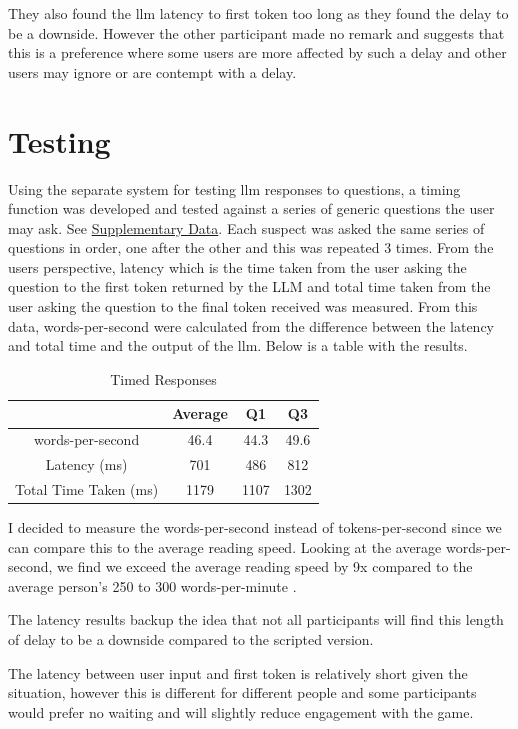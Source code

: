 \documentclass[12pt, a4paper]{report}
\begin{document}
	They also found the \gls{llm} latency to first token too long as they found the delay to be a downside. However the other participant made no remark and suggests that this is a preference where some users are more affected by such a delay and other users may ignore or are contempt with a delay.

	\section{Testing}
	Using the separate system for testing \gls{llm} responses to questions, a timing function was developed and tested against a series of generic questions the user may ask. See \hyperref[section:timedresponses]{Supplementary Data}. Each suspect was asked the same series of questions in order, one after the other and this was repeated 3 times. From the users perspective, latency which is the time taken from the user asking the question to the first token returned by the LLM and total time taken from the user asking the question to the final token received was measured. From this data, words-per-second were calculated from the difference between the latency and total time and the output of the \gls{llm}. Below is a table with the results.
	
	\begin{table}[h!]
		\centering
		\begin{tabular}{|c|c|c|c|}
			\hline
			& Average & Q1 & Q3 \\ \hline
			words-per-second & 46.4 & 44.3 & 49.6 \\ \hline
			Latency (ms) & 701 & 486 & 812 \\ \hline
			Total Time Taken (ms) & 1179 & 1107 & 1302 \\ \hline
		\end{tabular}
		\caption{Timed Responses}
	\end{table}
	
	I decided to measure the words-per-second instead of tokens-per-second since we can compare this to the average reading speed. Looking at the average words-per-second, we find we exceed the average reading speed by 9x compared to the average person's 250 to 300 words-per-minute \parencite{wallace2022towards}.
	
	The latency results backup the idea that not all participants will find this length of delay to be a downside compared to the scripted version.
	
	The latency between user input and first token is relatively short given the situation, however this is different for different people and some participants would prefer no waiting and will slightly reduce engagement with the game.
\end{document}
